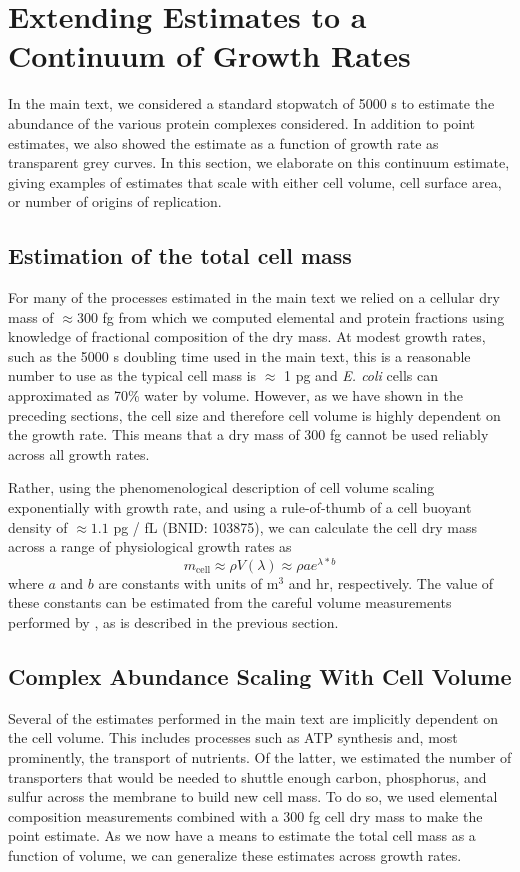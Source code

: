 \section{Extending Estimates to a Continuum of Growth Rates}
\label{sec:SI_continuum_est}
In the main text, we considered a standard stopwatch of 5000 s to estimate the
abundance of the various protein complexes considered. In addition to point
estimates, we also showed the estimate as a function of growth rate as
transparent grey curves. In this section, we elaborate on this continuum
estimate, giving examples of estimates that scale with either cell volume, cell
surface area, or number of origins of replication.

\subsection{Estimation of the total cell mass}
For many of the processes estimated in the main text we relied on a cellular dry
mass of $\approx 300$ fg from which we computed elemental and protein fractions
using knowledge of fractional composition of the dry mass. At modest growth
rates, such as the 5000 s doubling time used in the main text, this is a
reasonable number to use as the typical cell mass is $\approx$ 1 pg and
\textit{E. coli} cells can approximated as 70\% water by volume. However, as we
have shown in the preceding sections, the cell size and therefore cell
volume is highly dependent on the growth rate. This means that a dry mass of 300
fg cannot be used reliably across all growth rates.

Rather, using the phenomenological  description of cell volume scaling
exponentially with growth rate, and using a rule-of-thumb of a cell buoyant
density of $\approx 1.1$ pg / fL (BNID: 103875), we can calculate the cell dry mass across a
range of physiological growth rates as
\begin{equation}
    m_\text{cell} \approx \rho V(\lambda) \approx \rho ae^{\lambda * b}
    \label{eq:def_mcell}
\end{equation}
where $a$ and $b$ are constants with units of \textmu m$^3$  and hr,
respectively. The value of these constants can be estimated from the careful
volume measurements performed by \cite{si2017}, as is described in the previous
section.

\subsection{Complex Abundance Scaling With Cell Volume}
Several of the estimates performed in the main text are implicitly dependent
on the cell volume. This includes processes such as ATP synthesis and, most
prominently, the transport of nutrients. Of the latter, we estimated the
number of transporters that would be needed to shuttle enough carbon,
phosphorus, and sulfur across the membrane to build new cell mass. To do so,
we used elemental composition measurements combined with a 300 fg cell dry
mass to make the point estimate. As we now have a means to estimate the total
cell mass as a function of volume, we can generalize these estimates across
growth rates.

